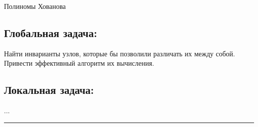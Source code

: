 \documentclass[a4paper,8pt]{extarticle}
\begin{document}
\begin{center}
    \Huge Полиномы Хованова
\end{center}
\begin{multicols}{2}
\subsection*{Глобальная задача:}
Найти инварианты узлов, которые бы позволили различать их между собой. Привести эффективный алгоритм их вычисления.

\columnbreak
\subsection*{Локальная задача:}
...
\end{multicols}

\hrule
\end{document}
